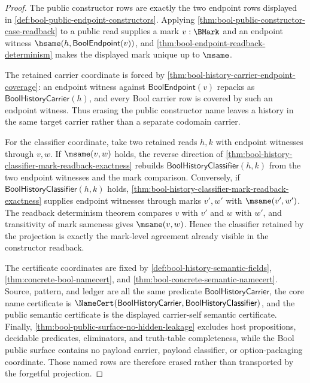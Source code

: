 \begin{proof}
The public constructor rows are exactly the two endpoint rows displayed in \autoref{def:bool-public-endpoint-constructors}. Applying \autoref{thm:bool-public-constructor-case-readback} to a public read supplies a mark $v:\BMark$ and an endpoint witness $\hsame(h,\mathsf{BoolEndpoint}(v))$, and \autoref{thm:bool-endpoint-readback-determinism} makes the displayed mark unique up to $\msame$.

The retained carrier coordinate is forced by \autoref{thm:bool-history-carrier-endpoint-coverage}: an endpoint witness against $\mathsf{BoolEndpoint}(v)$ repacks as $\mathsf{BoolHistoryCarrier}(h)$, and every Bool carrier row is covered by such an endpoint witness. Thus erasing the public constructor name leaves a history in the same target carrier rather than a separate codomain carrier.

For the classifier coordinate, take two retained reads $h,k$ with endpoint witnesses through $v,w$. If $\msame(v,w)$ holds, the reverse direction of \autoref{thm:bool-history-classifier-mark-readback-exactness} rebuilds $\mathsf{BoolHistoryClassifier}(h,k)$ from the two endpoint witnesses and the mark comparison. Conversely, if $\mathsf{BoolHistoryClassifier}(h,k)$ holds, \autoref{thm:bool-history-classifier-mark-readback-exactness} supplies endpoint witnesses through marks $v',w'$ with $\msame(v',w')$. The readback determinism theorem compares $v$ with $v'$ and $w$ with $w'$, and transitivity of mark sameness gives $\msame(v,w)$. Hence the classifier retained by the projection is exactly the mark-level agreement already visible in the constructor readback.

The certificate coordinates are fixed by \autoref{def:bool-history-semantic-fields}, \autoref{thm:concrete-bool-namecert}, and \autoref{thm:bool-concrete-semantic-namecert}. Source, pattern, and ledger are all the same predicate $\mathsf{BoolHistoryCarrier}$, the core name certificate is $\NameCert(\mathsf{BoolHistoryCarrier},\mathsf{BoolHistoryClassifier})$, and the public semantic certificate is the displayed carrier-self semantic certificate. Finally, \autoref{thm:bool-public-surface-no-hidden-leakage} excludes host propositions, decidable predicates, eliminators, and truth-table completeness, while the Bool public surface contains no payload carrier, payload classifier, or option-packaging coordinate. Those named rows are therefore erased rather than transported by the forgetful projection.
\end{proof}


